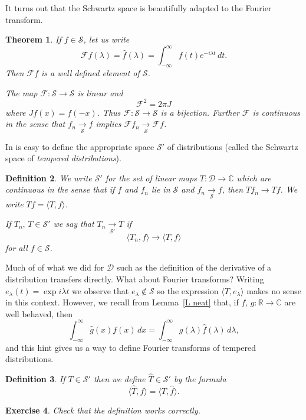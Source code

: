 \documentclass[12pt]{article}
\newtheorem{theorem}{Theorem}[section]
\newtheorem{definition}[theorem]{Definition}
\newtheorem{exercise}[theorem]{Exercise}
\theoremstyle{definition}
\newcommand{\arrowS}{\underset{\mathcal S}{\rightarrow}}
\newcommand{\arrows}{\underset{{\mathcal S}'}{\rightarrow}}
\begin{document}
It turns out that the Schwartz space is beautifully adapted
to the Fourier transform.
\begin{theorem}\label{good S} 
If $f\in{\mathcal S}$, let us write
\[{\mathcal F}f(\lambda)=\hat{f}(\lambda)
=\int_{-\infty}^{\infty}f(t)e^{-i\lambda t}\,dt.\]
Then ${\mathcal F}f$ is a well defined element of 
${\mathcal S}$.

The map ${\mathcal F}:{\mathcal S}\rightarrow{\mathcal S}$
is linear and
\[{\mathcal F}^{2}=2\pi J\]
where $Jf(x)=f(-x)$. Thus 
${\mathcal F}:{\mathcal S}\rightarrow{\mathcal S}$
is a bijection. Further ${\mathcal F}$ is continuous
in the sense that $f_{n}\arrowS f$ implies 
${\mathcal F}f_{n}\arrowS{\mathcal F}f$.
\end{theorem}

In is easy to define the appropriate space ${\mathcal S}'$
of distributions (called the Schwartz space of \emph{tempered distributions}).
\begin{definition}
We write ${\mathcal S}'$
for the set of linear maps $T:{\mathcal D}\rightarrow{\mathbb C}$
which are continuous in the sense that
if $f$ and $f_{n}$ lie in
${\mathcal S}$ and $f_{n}\arrowS f$,
then $Tf_{n}\rightarrow Tf$. We write
$Tf=\langle T,f\rangle$.

If $T_{n},\,T\in{\mathcal S}'$
we say that $T_{n}\arrows T$ if
\[\langle T_{n},f\rangle\rightarrow \langle T,f\rangle\]
for all $f\in{\mathcal S}$.
\end{definition} 

Much of of what we did for ${\mathcal D}$ such as the
definition of the derivative of a distribution transfers directly.
What about Fourier transforms?
Writing $e_{\lambda}(t)=\exp i\lambda t$ we observe that
$e_{\lambda}\notin{\mathcal S}$ so the expression
$ \langle T,e_{\lambda}\rangle$ makes no sense in this context.
However, we recall from Lemma~\ref{L neat} 
that, if $f,\,g:{\mathbb R}\rightarrow{\mathbb C}$
are well behaved, then
\[\int_{-\infty}^{\infty}\hat{g}(x)f(x)\,dx
=\int_{-\infty}^{\infty}g(\lambda)\hat{f}(\lambda)\,d\lambda,\]
and this hint gives us a way to define Fourier transforms
of tempered distributions.
\begin{definition} If $T\in{\mathcal S}'$ then we
define $\hat{T}\in{\mathcal S}'$ by the formula
\[\langle \hat{T},f\rangle=\langle T,\hat{f}\rangle.\]
\end{definition}
\begin{exercise} Check that the definition works correctly.
\end{exercise}
 
\end{document}
